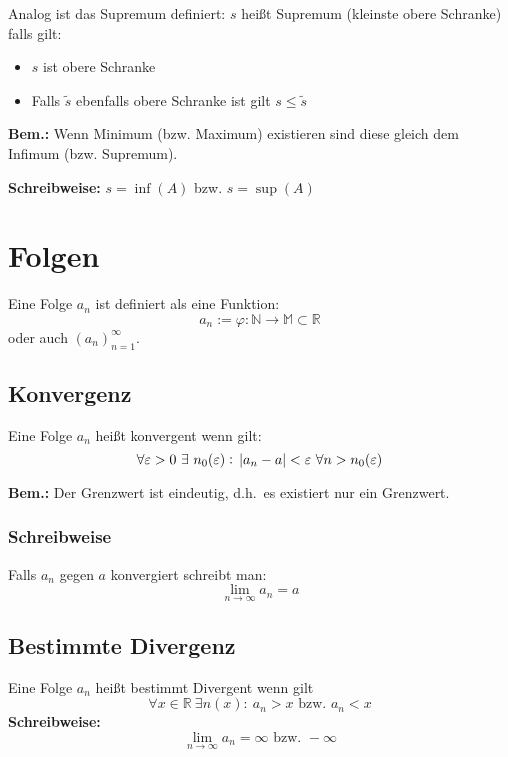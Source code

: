 \documentclass[10pt]{article}
\newcommand{\an}{{(a_n)}_{n=1}^\infty}
\begin{document}
     Analog ist das Supremum definiert: $s$ heißt Supremum (kleinste obere Schranke) falls gilt:
    \begin{itemize}
        \item $s$ ist obere Schranke
        \item Falls $\tilde{s}$ ebenfalls obere Schranke ist gilt
        $s\leq\tilde{s}$
    \end{itemize}

    \textbf{Bem.:}
    Wenn Minimum (bzw. Maximum) existieren sind diese gleich dem
    Infimum (bzw. Supremum).

    \textbf{Schreibweise:}
    $s = \inf{(A)}$ bzw. $s = \sup{(A)}$


    \section{Folgen}
    Eine Folge $a_n$ ist definiert als eine Funktion:
    \begin{equation*}
        a_n := \varphi: \mathbb{N} \rightarrow \mathbb{M} \subset \mathbb{R}
    \end{equation*}
    oder auch $\an$.

    \subsection{Konvergenz}
    Eine Folge $a_n$ heißt konvergent wenn gilt:
    \begin{equation*}
        \forall \varepsilon>0\ \exists~n_0(\varepsilon):\ \abs{a_n - a} < \varepsilon\ \forall n > n_0(\varepsilon)
    \end{equation*}

    \textbf{Bem.:}
    Der Grenzwert ist eindeutig, d.h.\ es existiert nur ein Grenzwert.

    \subsubsection{Schreibweise}
    Falls $a_n$ gegen $a$ konvergiert schreibt man:
    \begin{equation*}
        \lim_{n \rightarrow \infty} a_n = a
    \end{equation*}

    \subsection{Bestimmte Divergenz}
    Eine Folge $a_n$ heißt bestimmt Divergent wenn gilt
    \begin{equation*}
        \forall x \in \mathbb{R}\ \exists n(x):\ a_n>x \text{ bzw. } a_n<x
    \end{equation*}
    \textbf{Schreibweise:}
    \begin{equation*}
        \lim_{n \rightarrow \infty} a_n = \infty \text{ bzw. } -\infty
    \end{equation*}
\end{document}
